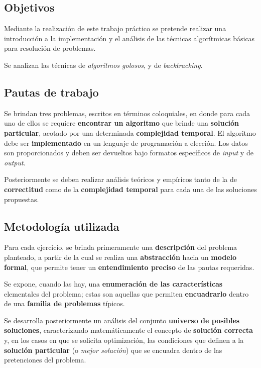 \documentclass[11pt, a4paper, twoside]{article}
\begin{document}
{}

\subsection{Objetivos}
Mediante la realización de este trabajo práctico se pretende realizar una introducción a la implementación y el análisis de las técnicas algorítmicas básicas para resolución de problemas. 

Se analizan las técnicas de \textit{algoritmos golosos}, y de \textit{backtracking}.

\subsection{Pautas de trabajo}
Se brindan tres problemas, escritos en términos coloquiales, en donde para cada uno de ellos se requiere \textbf{encontrar un algoritmo} que brinde una \textbf{solución particular}, acotado por una determinada \textbf{complejidad temporal}. El algoritmo debe ser \textbf{implementado} en un lenguaje de programación a elección. Los datos son proporcionados y deben ser devueltos bajo formatos específicos de \textit{input} y de \textit{output}.

Posteriormente se deben realizar análisis teóricos y empíricos tanto de la de \textbf{correctitud} como de la \textbf{complejidad temporal} para cada una de las soluciones propuestas.

\subsection{Metodología utilizada}
Para cada ejercicio, se brinda primeramente una \textbf{descripción} del problema planteado, a partir de la cual se realiza una \textbf{abstracción} hacia un \textbf{modelo formal}, que permite tener un \textbf{entendimiento preciso} de las pautas requeridas. 

Se expone, cuando las hay, una \textbf{enumeración de las características} elementales del problema; estas son aquellas que permiten \textbf{encuadrarlo} dentro de una \textbf{familia de problemas} típicos.

Se desarrolla posteriormente un análisis del conjunto \textbf{universo de posibles soluciones}, caracterizando matemáticamente el concepto de \textbf{solución correcta} y, en los casos en que se solicita optimización, las condiciones que definen a la \textbf{solución particular} (o \textit{mejor solución}) que se encuadra dentro de las pretenciones del problema.
\end{document}
